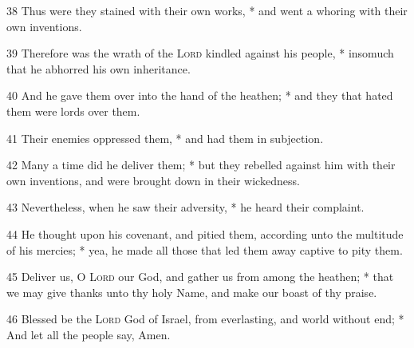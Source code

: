 38 Thus were they stained with their own works, * and went a whoring with their own inventions.\par
39 Therefore was the wrath of the {\textsc{Lord}} kindled against his people, * insomuch that he abhorred his own inheritance.\par
40 And he gave them over into the hand of the heathen; * and they that hated them were lords over them.\par
41 Their enemies oppressed them, * and had them in subjection.\par
42 Many a time did he deliver them; * but they rebelled against him with their own inventions, and were brought down in their wickedness.\par
43 Nevertheless, when he saw their adversity, * he heard their complaint.\par
44 He thought upon his covenant, and pitied them, according unto the multitude of his mercies; * yea, he made all those that led them away captive to pity them.\par
45 Deliver us, O {\textsc{Lord}} our God, and gather us from among the heathen; * that we may give thanks unto thy holy Name, and make our boast of thy praise.\par
46 Blessed be the {\textsc{Lord}} God of Israel, from everlasting, and world without end; * And let all the people say, Amen.
